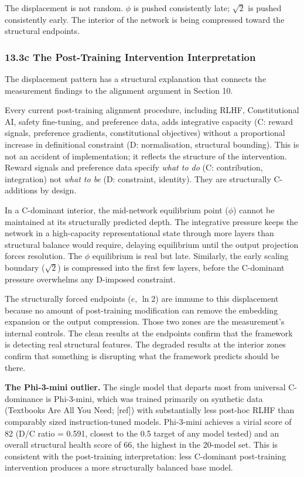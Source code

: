 \documentclass[12pt]{article}
\begin{document}
The displacement is not random. \(\phi\) is pushed consistently late;
\(\sqrt{2}\) is pushed consistently early. The interior of the network
is being compressed toward the structural endpoints.

\subsubsection{13.3c The Post-Training Intervention
Interpretation}\label{c-the-post-training-intervention-interpretation}

The displacement pattern has a structural explanation that connects the
measurement findings to the alignment argument in Section 10.

Every current post-training alignment procedure, including RLHF,
Constitutional AI, safety fine-tuning, and preference data, adds
integrative capacity (C: reward signals, preference gradients,
constitutional objectives) without a proportional increase in
definitional constraint (D: normalisation, structural bounding). This is
not an accident of implementation; it reflects the structure of the
intervention. Reward signals and preference data specify \emph{what to
do} (C: contribution, integration) not \emph{what to be} (D: constraint,
identity). They are structurally C-additions by design.

In a C-dominant interior, the mid-network equilibrium point (\(\phi\))
cannot be maintained at its structurally predicted depth. The
integrative pressure keeps the network in a high-capacity
representational state through more layers than structural balance would
require, delaying equilibrium until the output projection forces
resolution. The \(\phi\) equilibrium is real but late. Similarly, the
early scaling boundary (\(\sqrt{2}\)) is compressed into the first few
layers, before the C-dominant pressure overwhelms any D-imposed
constraint.

The structurally forced endpoints (\(e\), \(\ln 2\)) are immune to this
displacement because no amount of post-training modification can remove
the embedding expansion or the output compression. Those two zones are
the measurement's internal controls. The clean results at the endpoints
confirm that the framework is detecting real structural features. The
degraded results at the interior zones confirm that something is
disrupting what the framework predicts should be there.

\textbf{The Phi-3-mini outlier.} The single model that departs most from
universal C-dominance is Phi-3-mini, which was trained primarily on
synthetic data (Textbooks Are All You Need; {[}ref{]}) with
substantially less post-hoc RLHF than comparably sized instruction-tuned
models. Phi-3-mini achieves a virial score of 82 (D/C ratio = 0.591,
closest to the 0.5 target of any model tested) and an overall structural
health score of 66, the highest in the 20-model set. This is consistent
with the post-training interpretation: less C-dominant post-training
intervention produces a more structurally balanced base model.
\end{document}
